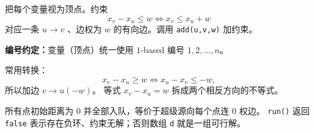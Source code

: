 把每个变量视为顶点。约束
\[
  x_v-x_u\le w
  \iff x_v\le x_u+w
\]
对应一条 $u\to v$ 、边权为 $w$ 的有向边。调用 \texttt{add(u,v,w)} 加约束。

\textbf{编号约定：}变量（顶点）统一使用 $1$-based 编号 $1,2,\ldots,n$。

常用转换：
\[
  x_v-x_u\ge w
  \iff x_u-x_v\le-w,
\]
所以加边 $v\to u(-w)$。
等式 $x_v-x_u=w$ 拆成两个相反方向的不等式。

所有点初始距离为 $0$ 并全部入队，等价于超级源向每个点连 $0$ 权边。
\texttt{run()} 返回 \texttt{false} 表示存在负环、约束无解；否则数组 \texttt{d} 就是一组可行解。

